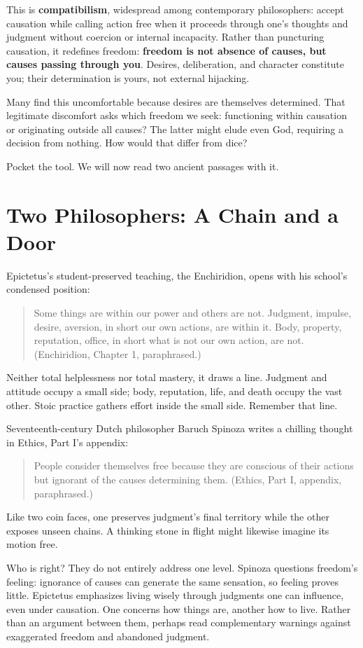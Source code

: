 This is \textbf{compatibilism}, widespread among contemporary philosophers: accept causation while calling action free when it proceeds through one's thoughts and judgment without coercion or internal incapacity. Rather than puncturing causation, it redefines freedom: \textbf{freedom is not absence of causes, but causes passing through you}. Desires, deliberation, and character constitute you; their determination is yours, not external hijacking.

Many find this uncomfortable because desires are themselves determined. That legitimate discomfort asks which freedom we seek: functioning within causation or originating outside all causes? The latter might elude even God, requiring a decision from nothing. How would that differ from dice?

Pocket the tool. We will now read two ancient passages with it.

\section{Two Philosophers: A Chain and a Door}
Epictetus's student-preserved teaching, the Enchiridion, opens with his school's condensed position:

\begin{quote}
Some things are within our power and others are not. Judgment, impulse, desire, aversion, in short our own actions, are within it. Body, property, reputation, office, in short what is not our own action, are not. (Enchiridion, Chapter 1, paraphrased.)
\end{quote}
Neither total helplessness nor total mastery, it draws a line. Judgment and attitude occupy a small side; body, reputation, life, and death occupy the vast other. Stoic practice gathers effort inside the small side. Remember that line.

Seventeenth-century Dutch philosopher Baruch Spinoza writes a chilling thought in Ethics, Part I's appendix:

\begin{quote}
People consider themselves free because they are conscious of their actions but ignorant of the causes determining them. (Ethics, Part I, appendix, paraphrased.)
\end{quote}
Like two coin faces, one preserves judgment's final territory while the other exposes unseen chains. A thinking stone in flight might likewise imagine its motion free.

Who is right? They do not entirely address one level. Spinoza questions freedom's feeling: ignorance of causes can generate the same sensation, so feeling proves little. Epictetus emphasizes living wisely through judgments one can influence, even under causation. One concerns how things are, another how to live. Rather than an argument between them, perhaps read complementary warnings against exaggerated freedom and abandoned judgment.


